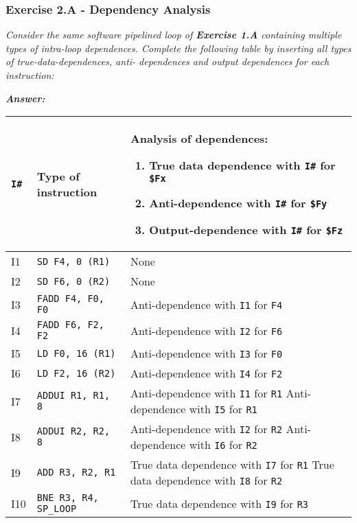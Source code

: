 \newpage

\subsubsection*{Exercise 2.A - Dependency Analysis}

\emph{Consider the same software pipelined loop of \textbf{Exercise 1.A} containing multiple types of intra-loop dependences. Complete the following table by inserting all types of true-data-dependences, anti-
dependences and output dependences for each instruction:}

\highspace
\textcolor{Green3}{\textbf{\emph{Answer:}}}

\begin{table}[!htp]
    \centering
    \begin{tabular}{@{} l | l | p{20em} @{}}
        \toprule
        \texttt{I\#} & \textbf{Type of instruction}   & \textbf{Analysis of dependences:} \begin{enumerate}
            \item True data dependence with \texttt{I\#} for \texttt{\$Fx}
            \item Anti-dependence with \texttt{I\#} for \texttt{\$Fy}
            \item Output-dependence with \texttt{I\#} for \texttt{\$Fz}
        \end{enumerate} \\
        \midrule
        I1  & \texttt{SD F4, 0 (R1)} & None \\ [.3em]
        I2  & \texttt{SD F6, 0 (R2)} & None \\ [.3em]
        I3  & \texttt{FADD F4, F0, F0} & Anti-dependence with \texttt{I1} for \texttt{F4} \\ [.3em]
        I4  & \texttt{FADD F6, F2, F2} & Anti-dependence with \texttt{I2} for \texttt{F6} \\ [.3em]
        I5  & \texttt{LD F0, 16 (R1)} & Anti-dependence with \texttt{I3} for \texttt{F0} \\ [.3em]
        I6  & \texttt{LD F2, 16 (R2)} & Anti-dependence with \texttt{I4} for \texttt{F2} \\ [.3em]
        I7  & \texttt{ADDUI R1, R1, 8} & Anti-dependence with \texttt{I1} for \texttt{R1} \newline Anti-dependence with \texttt{I5} for \texttt{R1} \\ [.3em]
        I8  & \texttt{ADDUI R2, R2, 8} & Anti-dependence with \texttt{I2} for \texttt{R2} \newline Anti-dependence with \texttt{I6} for \texttt{R2} \\ [.3em]
        I9  & \texttt{ADD R3, R2, R1} & True data dependence with \texttt{I7} for \texttt{R1} \newline True data dependence with \texttt{I8} for \texttt{R2} \\ [.3em]
        I10 & \texttt{BNE R3, R4, SP\_LOOP} & True data dependence with \texttt{I9} for \texttt{R3} \\
        \bottomrule
    \end{tabular}
\end{table}

